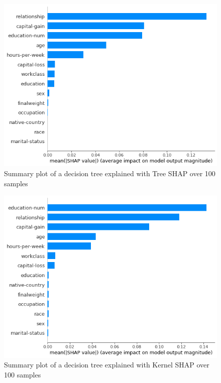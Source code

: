 \documentclass[conference]{IEEEtran}
\begin{document}
\begin{figure}[htbp]
\centerline{
	\includegraphics[width=\linewidth]{../fig/ex_02_TreeShap_100_Samples_SummaryPlot.png}
}
\caption{Summary plot of a decision tree explained with Tree SHAP over 100 samples}
\label{fig6}
\end{figure}

\begin{figure}[htbp]
\centerline{
	\includegraphics[width=\linewidth]{../fig/ex_02_KernelShap_100_Samples_SummaryPlot.png}
}
\caption{Summary plot of a decision tree explained with Kernel SHAP over 100 samples}
\label{fig7}
\end{figure}
\end{document}
